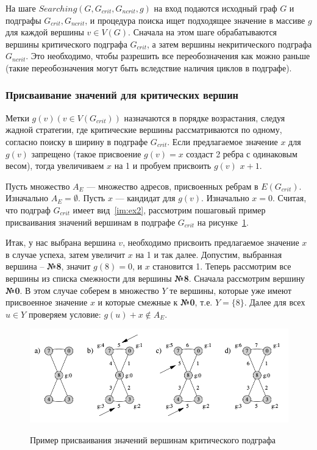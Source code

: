 \documentclass[specialist,
               substylefile = spbu.rtx,
               subf,href,colorlinks=true, 12pt]{disser}
\begin{document}
На шаге $Searching (G, G_{crit}, G_{ncrit}, g)$ на вход подаются исходный граф $G$ и подграфы $G_{crit}, G_{ncrit}$, и процедура поиска ищет подходящее значение в массиве $g$ для каждой вершины $v \in V(G)$. Сначала на этом шаге обрабатываются вершины критического подграфа $G_{crit}$, а затем вершины некритического подграфа $G_{ncrit}$. Это необходимо, чтобы разрешить все переобозначения как можно раньше (такие переобозначения могут быть вследствие наличия циклов в подграфе).

\subsubsection{Присваивание значений для критических вершин}

Метки $g(v) (v \in V(G_{crit}))$ назначаются в порядке возрастания, следуя жадной стратегии, где критические вершины рассматриваются по одному, согласно поиску в ширину в подграфе $G_{crit}$. Если предлагаемое значение $x$ для $g(v)$ запрещено (такое присвоение $g(v) = x$ создаст 2 ребра с одинаковым весом), тогда увеличиваем $x$ на 1 и пробуем присвоить $g(v)$ $x+1$.

Пусть множество $A_E$ --- множество адресов, присвоенных ребрам в $E(G_{crit})$. Изначально $A_E = \emptyset$. Пусть $x$ --- кандидат для $g(v)$. Изначально $x = 0$. Считая, что подграф $G_{crit}$ имеет вид~\ref{im:ex2}, рассмотрим пошаговый пример присваивания значений вершинам в подграфе $G_{crit}$ на рисунке~\ref{im:ex3}.

Итак, у нас выбрана вершина $v$, необходимо присвоить предлагаемое значение $x$ в случае успеха, затем увеличит $x$ на 1 и так далее. Допустим, выбранная вершина -- \textbf{№8}, значит $g(8) = 0$, и $x$ становится 1. Теперь рассмотрим все вершины из списка смежности для вершины \textbf{№8}. Сначала рассмотрим вершину \textbf{№0}. В этом случае соберем в множество $Y$ те вершины, которые уже имеют присвоенное значение $x$ и которые смежные к \textbf{№0}, т.е. $Y = \{8\}$. Далее для всех $u \in Y$ проверяем условие: $g(u) + x \notin A_E$.

\begin{figure}[h]
\begin{center}
\includegraphics[scale=0.35]{imgs/ex3.jpg}\label{im:ex3}
\caption{Пример присваивания значений вершинам критического подграфа}
\end{center}
\end{figure}
\end{document}
